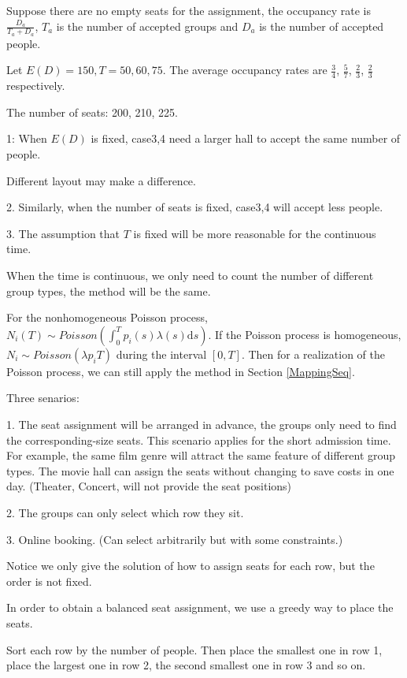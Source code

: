 Suppose there are no empty seats for the assignment, the occupancy rate is $\frac{D_{a}}{T_a + D_{a}}$, $T_a$ is the number of accepted groups and $D_a$ is the number of accepted people.

Let $E(D) = 150, T = 50, 60, 75$. The average occupancy rates are $\frac{3}{4}$, $\frac{5}{7}$, $\frac{2}{3}$, $\frac{2}{3}$ respectively.

The number of seats: 200, 210, 225.

1: When $E(D)$ is fixed, case3,4 need a larger hall to accept the same number of people.

Different layout may make a difference.

2. Similarly, when the number of seats is fixed, case3,4 will accept less people.

3. The assumption that $T$ is fixed will be more reasonable for the continuous time. 

When the time is continuous, we only need to count the number of different group types, the method will be the same.

For the nonhomogeneous Poisson process, $N_{i}(T) \sim Poisson (\int_0^{T} p_i(s)\lambda(s) \mathrm{d} s)$. If the Poisson process is homogeneous, $N_{i} \sim Poisson(\lambda p_i T)$ during the interval $[0, T]$. Then for a realization of the Poisson process, we can still apply the method in Section \ref{MappingSeq}.

Three senarios:

1. The seat assignment will be arranged in advance, the groups only need to find the corresponding-size seats. This scenario applies for the short admission time. For example, the same film genre will attract the same feature of different group types. The movie hall can assign the seats without changing to save costs in one day. (Theater, Concert, will not provide the seat positions)

2. The groups can only select which row they sit.

3. Online booking. (Can select arbitrarily but with some constraints.)


Notice we only give the solution of how to assign seats for each row, but the order is not fixed.

In order to obtain a balanced seat assignment, we use a greedy way to place the seats.

Sort each row by the number of people. Then place the smallest one in row 1, place the largest one in row 2, the second smallest one in row 3 and so on. 

